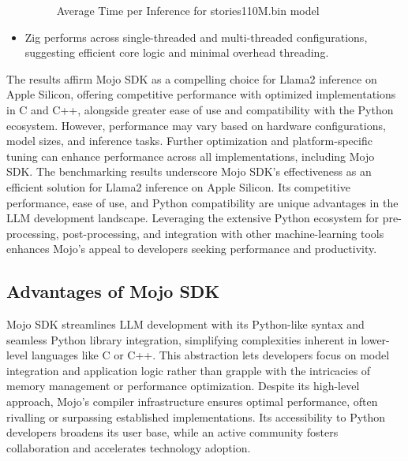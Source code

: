 \documentclass[conference]{IEEEtran}
\begin{document}
\begin{itemize}
      \begin{figure}[H]
        \centering
        \caption{Average Time per Inference for stories110M.bin model}
      \end{figure}

      \item Zig performs across single-threaded and multi-threaded configurations, suggesting efficient core logic and minimal overhead threading.
\end{itemize}
The results affirm Mojo SDK as a compelling choice for Llama2 inference on Apple Silicon, offering competitive performance with optimized implementations in C and C++, alongside greater ease of use and compatibility with the Python ecosystem. However, performance may vary based on hardware configurations, model sizes, and inference tasks. Further optimization and platform-specific tuning can enhance performance across all implementations, including Mojo SDK. The benchmarking results underscore Mojo SDK's effectiveness as an efficient solution for Llama2 inference on Apple Silicon. Its competitive performance, ease of use, and Python compatibility are unique advantages in the LLM development landscape. Leveraging the extensive Python ecosystem for pre-processing, post-processing, and integration with other machine-learning tools enhances Mojo's appeal to developers seeking performance and productivity.

\subsection{Advantages of Mojo SDK}
Mojo SDK streamlines LLM development with its Python-like syntax and seamless Python library integration, simplifying complexities inherent in lower-level languages like C or C++. This abstraction lets developers focus on model integration and application logic rather than grapple with the intricacies of memory management or performance optimization. Despite its high-level approach, Mojo's compiler infrastructure ensures optimal performance, often rivalling or surpassing established implementations. Its accessibility to Python developers broadens its user base, while an active community fosters collaboration and accelerates technology adoption.
\end{document}
